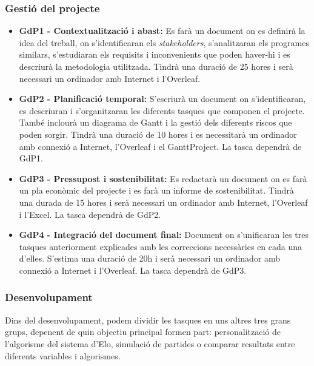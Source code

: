\documentclass[a4paper]{article}
\begin{document}
\subsubsection{Gestió del projecte}
\begin{itemize}
    \item \textbf{GdP1 - Contextualització i abast:} Es farà un document on es definirà la idea del treball, on s'identificaran els \textit{stakeholders}, s'analitzaran els programes similars, s'estudiaran els requisits i inconvenients que poden haver-hi i es descriurà la metodologia utilitzada. Tindrà una duració de 25 hores i serà necessari un ordinador amb Internet i l'Overleaf.
    \item \textbf{GdP2 - Planificació temporal:} S'escriurà un document on s'identificaran, es descriuran i s'organitzaran les diferents tasques que componen el projecte. També inclourà un diagrama de Gantt i la gestió dels diferents riscos que poden sorgir. Tindrà una duració de 10 hores i es necessitarà un ordinador amb connexió a Internet, l'Overleaf i el GanttProject. La tasca dependrà de GdP1.
    \item \textbf{GdP3 - Pressupost i sostenibilitat:} Es redactarà un document on es farà un pla econòmic del projecte i es farà un informe de sostenibilitat. Tindrà una durada de 15 hores i serà necessari un ordinador amb Internet, l'Overleaf i l'Excel. La tasca dependrà de GdP2.
    \item \textbf{GdP4 - Integració del document final:} Document on s'unificaran les tres tasques anteriorment explicades amb les correccions necessàries en cada una d'elles. S'estima una duració de 20h i serà necessari un ordinador amb connexió a Internet i l'Overleaf. La tasca dependrà de GdP3.
\end{itemize}

\subsubsection{Desenvolupament}
Dins del desenvolupament, podem dividir les tasques en uns altres tres grans grups, depenent de quin objectiu principal formen part: personalització de l’algorisme del sistema d’Elo, simulació de partides o comparar resultats entre diferents variables i algorismes.
\end{document}
